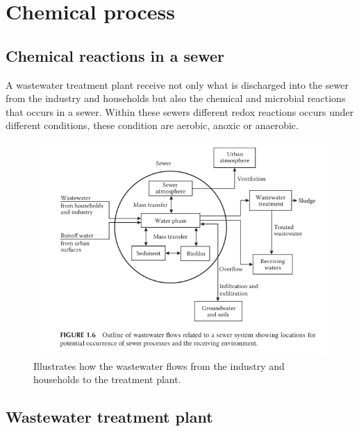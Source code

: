 \section{Chemical process}\label{se:chemical_process}


\subsection{Chemical reactions in a sewer}\label{subse:chemical_reactions_in_a_sewer}
A wastewater treatment plant receive not only what is discharged into the sewer from the industry and households but also the chemical and microbial reactions that occurs in a sewer. Within these sewers different redox reactions occurs under different conditions, these condition are aerobic, anoxic or anaerobic.    %



\begin{figure}[H]
\centering
\includegraphics[width=1\textwidth]{report/introduction/pictures/sewer_overview_of_the_different_parts.png}
\caption{Illustrates how the wastewater flows from the industry and households to the treatment plant. }
\label{fig:sewer_overview_of_the_different_parts}
\end{figure}


\subsection{Wastewater treatment plant}\label{subse:Wastewater treatment plant}

